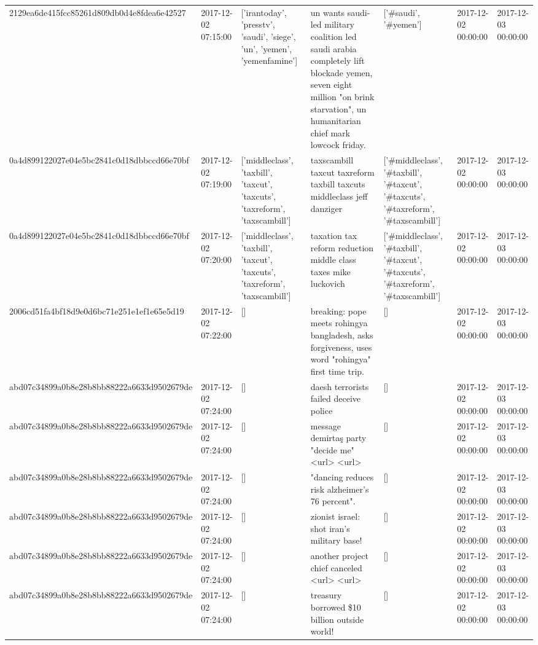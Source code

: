 \begin{tabular}{lllllll}
2129ea6de415fcc85261d809db0d4e8fdea6e42527 & 2017-12-02 07:15:00 & ['irantoday', 'presstv', 'saudi', 'siege', 'un', 'yemen', 'yemenfamine'] & un wants saudi-led military coalition led saudi arabia completely lift blockade yemen, seven eight million "on brink starvation", un humanitarian chief mark lowcock friday. & ['#saudi', '#yemen'] & 2017-12-02 00:00:00 & 2017-12-03 00:00:00 \\
0a4d899122027e04e5bc2841c0d18dbbccd66e70bf & 2017-12-02 07:19:00 & ['middleclass', 'taxbill', 'taxcut', 'taxcuts', 'taxreform', 'taxscambill'] & taxscambill taxcut taxreform taxbill taxcuts middleclass jeff danziger & ['#middleclass', '#taxbill', '#taxcut', '#taxcuts', '#taxreform', '#taxscambill'] & 2017-12-02 00:00:00 & 2017-12-03 00:00:00 \\
0a4d899122027e04e5bc2841c0d18dbbccd66e70bf & 2017-12-02 07:20:00 & ['middleclass', 'taxbill', 'taxcut', 'taxcuts', 'taxreform', 'taxscambill'] & taxation tax reform reduction middle class taxes mike luckovich & ['#middleclass', '#taxbill', '#taxcut', '#taxcuts', '#taxreform', '#taxscambill'] & 2017-12-02 00:00:00 & 2017-12-03 00:00:00 \\
2006cd51fa4bf18d9e0d6bc71e251e1ef1e65e5d19 & 2017-12-02 07:22:00 & [] & breaking: pope meets rohingya bangladesh, asks forgiveness, uses word "rohingya" first time trip. & [] & 2017-12-02 00:00:00 & 2017-12-03 00:00:00 \\
abd07c34899a0b8e28b8bb88222a6633d9502679de & 2017-12-02 07:24:00 & [] & daesh terrorists failed deceive police & [] & 2017-12-02 00:00:00 & 2017-12-03 00:00:00 \\
abd07c34899a0b8e28b8bb88222a6633d9502679de & 2017-12-02 07:24:00 & [] & message demirtaş party "decide me" <url> <url> & [] & 2017-12-02 00:00:00 & 2017-12-03 00:00:00 \\
abd07c34899a0b8e28b8bb88222a6633d9502679de & 2017-12-02 07:24:00 & [] & "dancing reduces risk alzheimer's 76 percent". & [] & 2017-12-02 00:00:00 & 2017-12-03 00:00:00 \\
abd07c34899a0b8e28b8bb88222a6633d9502679de & 2017-12-02 07:24:00 & [] & zionist israel: shot iran's military base! & [] & 2017-12-02 00:00:00 & 2017-12-03 00:00:00 \\
abd07c34899a0b8e28b8bb88222a6633d9502679de & 2017-12-02 07:24:00 & [] & another project chief canceled <url> <url> & [] & 2017-12-02 00:00:00 & 2017-12-03 00:00:00 \\
abd07c34899a0b8e28b8bb88222a6633d9502679de & 2017-12-02 07:24:00 & [] & treasury borrowed \$10 billion outside world! & [] & 2017-12-02 00:00:00 & 2017-12-03 00:00:00 \\

\end{tabular}
